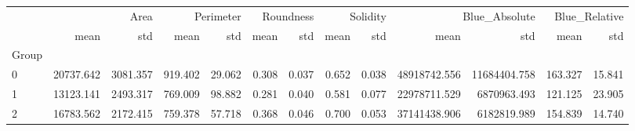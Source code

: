 \begin{tabular}{lrrrrrrrrrrrr}
\toprule
 & \multicolumn{2}{r}{Area} & \multicolumn{2}{r}{Perimeter} & \multicolumn{2}{r}{Roundness} & \multicolumn{2}{r}{Solidity} & \multicolumn{2}{r}{Blue_Absolute} & \multicolumn{2}{r}{Blue_Relative} \\
 & mean & std & mean & std & mean & std & mean & std & mean & std & mean & std \\
Group &  &  &  &  &  &  &  &  &  &  &  &  \\
\midrule
0 & 20737.642 & 3081.357 & 919.402 & 29.062 & 0.308 & 0.037 & 0.652 & 0.038 & 48918742.556 & 11684404.758 & 163.327 & 15.841 \\
1 & 13123.141 & 2493.317 & 769.009 & 98.882 & 0.281 & 0.040 & 0.581 & 0.077 & 22978711.529 & 6870963.493 & 121.125 & 23.905 \\
2 & 16783.562 & 2172.415 & 759.378 & 57.718 & 0.368 & 0.046 & 0.700 & 0.053 & 37141438.906 & 6182819.989 & 154.839 & 14.740 \\
\bottomrule
\end{tabular}
